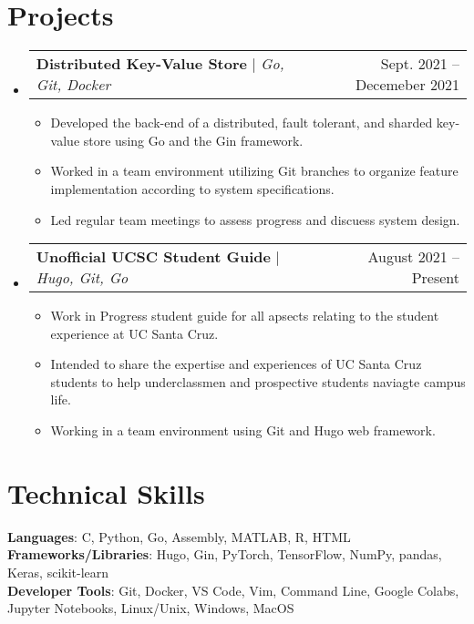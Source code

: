 \documentclass[letterpaper,11pt]{article}
\makeatletter
\newcommand{\resumeItem}[1]{
  \item\small{
    {#1 \vspace{-2pt}}
  }
}
\newcommand{\resumeProjectHeading}[2]{
    \item
    \begin{tabular*}{0.97\textwidth}{l@{\extracolsep{\fill}}r}
      \small#1 & #2 \\
    \end{tabular*}\vspace{-7pt}
}
\newcommand{\resumeSubHeadingListStart}{\begin{itemize}[leftmargin=0.15in, label={}]}
\newcommand{\resumeSubHeadingListEnd}{\end{itemize}}
\newcommand{\resumeItemListStart}{\begin{itemize}}
\newcommand{\resumeItemListEnd}{\end{itemize}\vspace{-5pt}}
\makeatother
\begin{document}
\section{Projects}
    \resumeSubHeadingListStart
      \resumeProjectHeading
          {\textbf{Distributed Key-Value Store} $|$ \emph{Go, Git, Docker}}{Sept. 2021 -- Decemeber 2021}
          \resumeItemListStart
            \resumeItem{Developed the back-end of a distributed, fault tolerant, and sharded key-value store using Go and the Gin framework.}
            \resumeItem{Worked in a team environment utilizing Git branches to organize feature implementation according to system specifications.}
            \resumeItem{Led regular team meetings to assess progress and discuess system design.}
          \resumeItemListEnd

      \resumeProjectHeading
          {\textbf{Unofficial UCSC Student Guide} $|$ \emph{Hugo, Git, Go}}{August 2021 -- Present}
          \resumeItemListStart
            \resumeItem{Work in Progress student guide for all apsects relating to the student experience at UC Santa Cruz.}
            \resumeItem{Intended to share the expertise and experiences of UC Santa Cruz students to help underclassmen and prospective students naviagte campus life.}
            \resumeItem{Working in a team environment using Git and Hugo web framework.}
          \resumeItemListEnd
    \resumeSubHeadingListEnd

\section{Technical Skills}
 \begin{itemize}[leftmargin=0.15in, label={}]
    \small{\item{
     \textbf{Languages}{: C, Python, Go, Assembly, MATLAB, R, HTML} \\
     \textbf{Frameworks/Libraries}{: Hugo, Gin, PyTorch, TensorFlow, NumPy, pandas, Keras, scikit-learn} \\
     \textbf{Developer Tools}{: Git, Docker, VS Code, Vim, Command Line, Google Colabs, Jupyter Notebooks, Linux/Unix, Windows, MacOS}}}
 \end{itemize}


\end{document}
